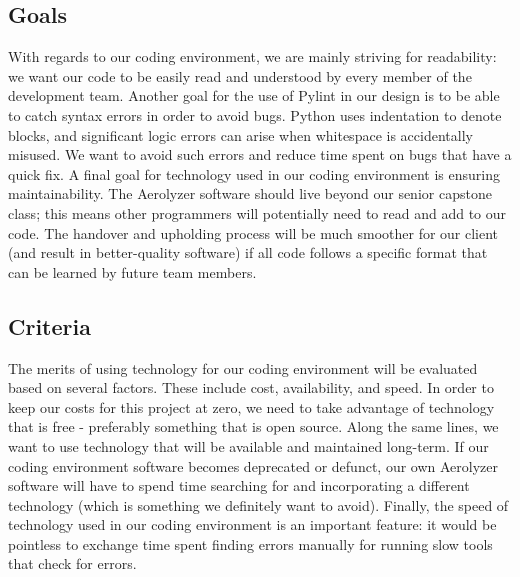 \documentclass[letterpaper,10pt,draftclsnofoot,onecolumn]{IEEEtran}
\begin{document}
\begin{flushleft}
\subsection{Goals}

With regards to our coding environment, we are mainly striving for readability: we want our code to be easily read and understood by every member of the development team. 
Another goal for the use of Pylint in our design is to be able to catch syntax errors in order to avoid bugs. 
Python uses indentation to denote blocks, and significant logic errors can arise when whitespace is accidentally misused. 
We want to avoid such errors and reduce time spent on bugs that have a quick fix. 
A final goal for technology used in our coding environment is ensuring maintainability. The Aerolyzer software should live beyond our senior capstone class; this means other programmers will potentially need to read and add to our code. The handover and upholding process will be much smoother for our client (and result in better-quality software) if all code follows a specific format that can be learned by future team members.



\subsection{Criteria}
The merits of using technology for our coding environment will be evaluated based on several factors. These include cost, availability, and speed. In order to keep our costs for this project at zero, we need to take advantage of technology that is free - preferably something that is open source. Along the same lines, we want to use technology that will be available and maintained long-term. If our coding environment software becomes deprecated or defunct, our own Aerolyzer software will have to spend time searching for and incorporating a different technology (which is something we definitely want to avoid). Finally, the speed of technology used in our coding environment is an important feature: it would be pointless to exchange time spent finding errors manually for running slow tools that check for errors. 




\end{flushleft}
\end{document}
